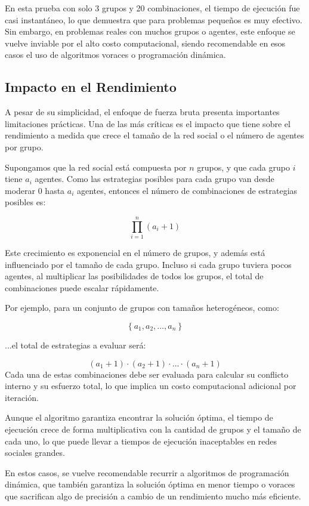 \documentclass[11pt,letter]{article}
\begin{document}
En esta prueba con solo 3 grupos y 20 combinaciones, el tiempo de ejecución fue casi instantáneo, lo que demuestra que para problemas pequeños es muy efectivo. Sin embargo, en problemas reales con muchos grupos o agentes, este enfoque se vuelve inviable por el alto costo computacional, siendo recomendable en esos casos el uso de algoritmos voraces o programación dinámica.

\subsection{Impacto en el Rendimiento}
\label{sec:limitaciones_fuerza_bruta}

A pesar de su simplicidad, el enfoque de fuerza bruta presenta importantes limitaciones prácticas. Una de las más críticas es el impacto que tiene sobre el rendimiento a medida que crece el tamaño de la red social o el número de agentes por grupo.

Supongamos que la red social está compuesta por \( n \) grupos, y que cada grupo \( i \) tiene \( a_i \) agentes. Como las estrategias posibles para cada grupo van desde moderar 0 hasta \( a_i \) agentes, entonces el número de combinaciones de estrategias posibles es:

\[
\prod_{i=1}^{n} (a_i + 1)
\]

Este crecimiento es exponencial en el número de grupos, y además está influenciado por el tamaño de cada grupo. Incluso si cada grupo tuviera pocos agentes, al multiplicar las posibilidades de todos los grupos, el total de combinaciones puede escalar rápidamente.

Por ejemplo, para un conjunto de grupos con tamaños heterogéneos, como:

\[
\left\{ a_1, a_2, \ldots, a_n \right\}
\]

...el total de estrategias a evaluar será:

\[
(a_1 + 1) \cdot (a_2 + 1) \cdot \ldots \cdot (a_n + 1)
\]
Cada una de estas combinaciones debe ser evaluada para calcular su conflicto interno y su esfuerzo total, lo que implica un costo computacional adicional por iteración.
\vspace{1em}
\noindent
\begin{tcolorbox}[colback=red!5!white, colframe=red!50!black, title=Advertencia sobre rendimiento]
 Aunque el algoritmo garantiza encontrar la solución óptima, el tiempo de ejecución crece de forma multiplicativa con la cantidad de grupos y el tamaño de cada uno, lo que puede llevar a tiempos de ejecución inaceptables en redes sociales grandes.

En estos casos, se vuelve recomendable recurrir a algoritmos de programación dinámica, que también garantiza la solución óptima en menor tiempo o voraces que sacrifican algo de precisión a cambio de un rendimiento mucho más eficiente.
\end{tcolorbox}
\end{document}

